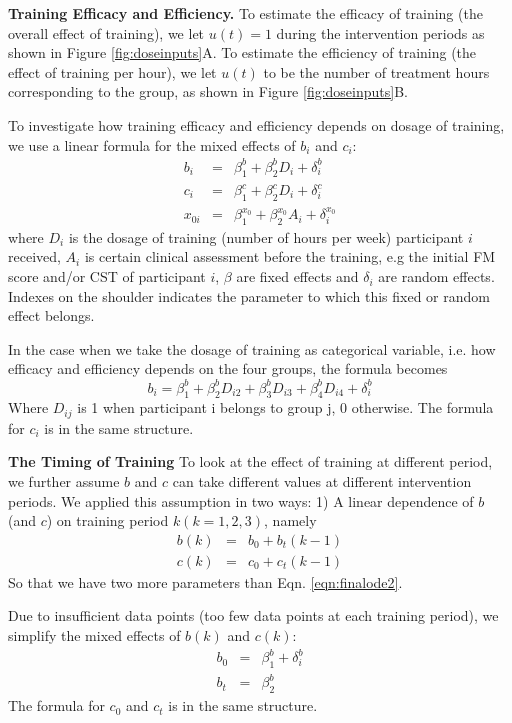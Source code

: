{\textbf{Training Efficacy and Efficiency.}
To estimate the efficacy of training (the overall effect of training), we let $ u(t)=1 $ during the intervention periods as shown in Figure  \ref{fig:doseinputs}A. 
To estimate the efficiency of training (the effect of training per hour), we let $ u(t) $ to be the number of treatment hours corresponding to the group, as shown in Figure  \ref{fig:doseinputs}B. 

To investigate how training efficacy and efficiency depends on dosage of training, we use a linear formula for the mixed effects of $ b_i $ and $ c_i $:
\begin{eqnarray}\label{eqn:mixedeffectinSM}
b_i &=& \beta_1^b + \beta_2^b D_i + \delta_i^b   \nonumber \\
c_i &=& \beta_1^c + \beta_2^c D_i + \delta_i^c   \\
x_{0i} &=& \beta_1^{x_0} + \beta_2^{x_0} A_i + \delta_i^{x_0} \nonumber
\end{eqnarray}
where $ D_i $ is the dosage of training (number of hours per week) participant $ i $ received, 
$ A_i $ is certain clinical assessment before the training, e.g the initial FM score and/or CST of participant $ i $, 
$ \beta $ are fixed effects and $ \delta_i $ are random effects. 
Indexes on the shoulder indicates the parameter to which this fixed or random effect belongs.

In the case when we take the dosage of training as categorical variable, i.e. how efficacy and efficiency depends on the four groups, the formula becomes
\begin{equation}
b_i = \beta_1^b + \beta_2^b D_{i2} + \beta_3^b D_{i3} + \beta_4^b D_{i4} + \delta_i^b
\end{equation}
Where $ D_{ij} $ is 1 when participant i belongs to group j, 0 otherwise. The formula for $ c_i $ is in the same structure.

\textbf{The Timing of Training}
To look at the effect of training at different period, we further assume $ b $ and $ c $ can take different values at different intervention periods. 
We applied this assumption in two ways: 1) A linear dependence of $ b $ (and $ c $) on training period $ k (k=1,2,3) $, namely
\begin{eqnarray}\label{eqn:timingcat2}
b(k) &=& b_0 + b_t (k-1) \nonumber  \\
c(k) &=& c_0 + c_t (k-1)
\end{eqnarray}
So that we have two more parameters than Eqn. \ref{eqn:finalode2}. 

Due to insufficient data points (too few data points at each training period), we simplify the mixed effects of $ b(k) $ and $ c(k) $:
\begin{eqnarray}
b_0 &=& \beta_1^b + \delta_i^b \\
b_t &=& \beta_2^b
\end{eqnarray}
The formula for $ c_0 $ and $ c_t $ is in the same structure.

}

